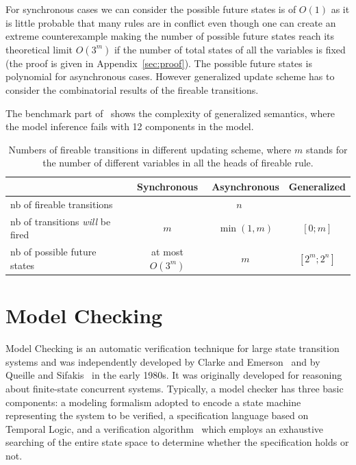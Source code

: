 For synchronous cases we can consider the possible future states is of $O(1)$ as it is little probable that many rules are in conflict even though one can create an extreme counterexample making the number of possible future states reach its theoretical limit $O(3^m)$ if the number of total states of all the variables is fixed (the proof is given in Appendix~\ref{sec:proof}).
The possible future states is polynomial for asynchronous cases.
However generalized update scheme has to consider the combinatorial results of the fireable transitions.

The benchmark part of~\cite{ribeiro2018learning} shows the complexity of generalized semantics, where the model inference fails with 12 components in the model. 

\begin{table}[ht]
    \centering
    \small
    \begin{tabular}{l|c|c|c}
        &Synchronous&Asynchronous&Generalized\\
        \hline
        nb of fireable transitions&\multicolumn{3}{c}{$n$}\\
        \hline
        nb of transitions \textit{will} be fired&$m$&$\min(1,m)$&$[0;m]$\\
        \hline
        nb of possible future states& at most $O(3^m)$&$m$&$[2^m;2^n]$
    \end{tabular}
    \caption[Update schemes]{Numbers of fireable transitions  in different updating scheme, where $m$ stands for the number of different variables in all the heads of fireable rule.}
    \label{tab:semantics}
\end{table}

\section{Model Checking}\label{sec:modelchecking}
Model Checking is an automatic verification technique for large state transition systems and was independently developed by Clarke and Emerson~\cite{clarke1981design} and by Queille and Sifakis~\cite{queille1982specification} in the early 1980s. It was originally developed for reasoning about finite-state concurrent systems.
Typically, a model checker has three basic components: a modeling formalism adopted to encode a state machine representing the system to be verified, a specification language based on Temporal Logic, and a verification algorithm~\cite{clarke20142} which employs an exhaustive searching of the entire state space to determine whether the specification holds or not.

